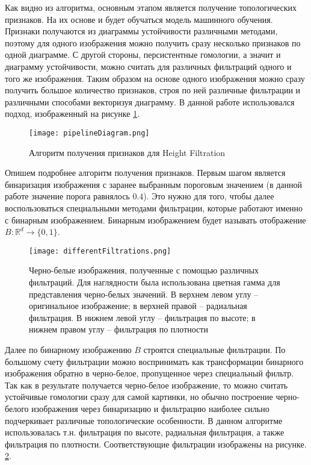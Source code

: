 Как видно из алгоритма, основным этапом является получение топологических признаков. На их основе и будет обучаться модель машинного обучения. Признаки получаются из диаграммы устойчивости различными методами, поэтому для одного изображения можно получить сразу несколько признаков по одной диаграмме. С другой стороны, персистентные гомологии, а значит и диаграмму устойчивости, можно считать для различных фильтраций одного и того же изображения. Таким образом на основе одного изображения можно сразу получить большое количество признаков, строя по ней различные фильтрации и различными способами векторизуя диаграмму. В данной работе использовался подход, изображенный на рисунке \ref{pipeline}.

\begin{figure}[!htbp]
	\begin{center}
		\texttt{[image: pipelineDiagram.png]}\\
		\caption{Алгоритм получения признаков для Height Filtration}
		\label{pipeline}
	\end{center}
\end{figure}

Опишем подробнее алгоритм получения признаков. Первым шагом является бинаризация изображения с заранее выбранным пороговым значением (в данной работе значение порога равнялось $0.4$). Это нужно для того, чтобы далее воспользоваться специальными методами фильтрации, которые работают именно с бинарным изображением. Бинарным изображением будет называть отображение $B: \mathbb{R}^d \to \{0, 1\}$.
\begin{figure}[!htbp]
	\begin{center}
		\texttt{[image: differentFiltrations.png]}\\
		\caption{Черно-белые изображения, полученные с помощью различных фильтраций. Для наглядности была использована цветная гамма для представления черно-белых значений. В верхнем левом углу -- оригинальное изображение; в верхней правой -- радиальная фильтрация. В нижнем левой углу -- фильтрация по высоте; в нижнем правом углу -- фильтрация по плотности }
		\label{filtration-comparison}
	\end{center}
\end{figure}

Далее по бинарному изображению $B$ строятся специальные фильтрации. По большому счету фильтрации можно воспринимать как трансформации бинарного изображения обратно в черно-белое, пропущенное через специальный фильтр. Так как в результате получается черно-белое изображение, то можно считать устойчивые гомологии сразу для самой картинки, но обычно построение черно-белого изображения через бинаризацию и фильтрацию наиболее сильно подчеркивает различные топологические особенности. В данном алгоритме использовалась т.н. фильтрация по высоте, радиальная фильтрация, а также фильтрация по плотности. Соответствующие фильтрации изображены на рисунке. \ref{filtration-comparison}.

